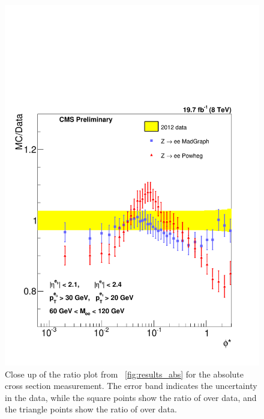 \begin{figure}[!p]
    \centering
    \includegraphics[width=\textwidth]{figures/ZShape_Ratioelec_Abs_Dressed.pdf}
    \caption[
        Close up of the ratio plot from \FIG~\ref{fig:results_abs} for the
        absolute cross section measurement.
    ]{
        Close up of the ratio plot from \FIG~\ref{fig:results_abs} for the
        absolute cross section measurement. The error band indicates the
        uncertainty in the data, while the square points show the ratio of
        \MADGRAPH over data, and the triangle points show the ratio of \POWHEG
        over data.
    }
    \label{fig:results_ratio_abs}
\end{figure}
